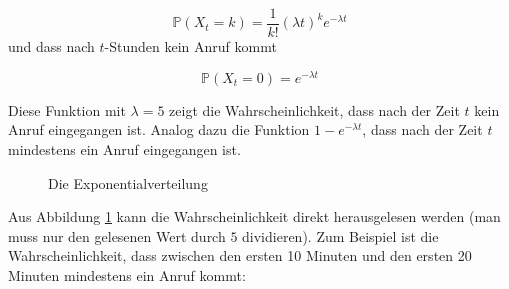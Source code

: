 {    \[
    \mathbb P\left(X_{t}=k\right)=
    \frac{1}{k!}{(\lambda t)}^{k}e^{-\lambda t}
    \]
    und dass nach $t$-Stunden kein Anruf kommt

    \[
    \mathbb P\left(X_{t}=0\right)=e^{-\lambda t}
    \]

    Diese Funktion mit $\lambda=5$ zeigt die Wahrscheinlichkeit, dass
    nach der Zeit $t$ kein Anruf eingegangen ist.
    Analog dazu die Funktion $1-e^{-\lambda t}$, dass nach der
    Zeit $t$ mindestens ein Anruf eingegangen ist.

    {
        \def\lambdavala{1}
        \def\lambdavalb{1.5}
        \def\lambdavalc{0.5}
        \def\xmax{5}
        \begin{figure}
            \subfigure[Dichtefunktion]{
                \begin{tikzpicture}
                    
                \end{tikzpicture}
                \label{fig:exponentialverteilung_a}
            }
            \subfigure[Verteilungsfunktion]{
                \begin{tikzpicture}
                    
                \end{tikzpicture}
                \label{fig:exponentialverteilung_b}
            }

            \def\lambdavala{5}
            \def\lambdavalb{2}
            \def\lambdavalc{3}
            \def\xmax{2}
            \subfigure[Dichtefunktion]{
                \begin{tikzpicture}
                    
                \end{tikzpicture}
                \label{fig:exponentialverteilung_a}
            }
            \subfigure[Verteilungsfunktion]{
                \begin{tikzpicture}
                    
                \end{tikzpicture}
                \label{fig:exponentialverteilung_b}
            }
            \caption{Die Exponentialverteilung}
           \label{fig:exponentialverteilung}
        \end{figure}
    }

    Aus Abbildung \ref{fig:exponentialverteilung} kann die Wahrscheinlichkeit direkt herausgelesen
    werden (man muss nur den gelesenen Wert durch $5$ dividieren). Zum Beispiel ist die Wahrscheinlichkeit, dass zwischen den
    ersten 10 Minuten und den ersten 20 Minuten mindestens ein Anruf kommt:

}
